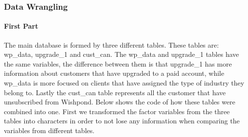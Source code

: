 \documentclass[]{article}
\newenvironment{Shaded}{\begin{snugshade}}{\end{snugshade}}
\newcommand{\KeywordTok}[1]{\textcolor[rgb]{0.13,0.29,0.53}{\textbf{#1}}}
\newcommand{\DecValTok}[1]{\textcolor[rgb]{0.00,0.00,0.81}{#1}}
\newcommand{\StringTok}[1]{\textcolor[rgb]{0.31,0.60,0.02}{#1}}
\newcommand{\CommentTok}[1]{\textcolor[rgb]{0.56,0.35,0.01}{\textit{#1}}}
\newcommand{\OperatorTok}[1]{\textcolor[rgb]{0.81,0.36,0.00}{\textbf{#1}}}
\newcommand{\NormalTok}[1]{#1}
\let\oldparagraph\paragraph
\renewcommand{\paragraph}[1]{\oldparagraph{#1}\mbox{}}
\begin{document}
\subsubsection{Data Wrangling}\label{data-wrangling}

\paragraph{First Part}\label{first-part}

The main database is formed by three different tables. These tables are:
wp\_data, upgrade\_1 and cust\_can. The wp\_data and upgrade\_1 tables
have the same variables, the difference between them is that upgrade\_1
has more information about customers that have upgraded to a paid
account, while wp\_data is more focused on clients that have assigned
the type of industry they belong to. Lastly the cust\_can table
represents all the customer that have unsubscribed from Wishpond. Below
shows the code of how these tables were combined into one. First we
transformed the factor variables from the three tables into characters
in order to not lose any information when comparing the variables from
different tables.

\begin{Shaded}
\end{Shaded}
\end{document}
